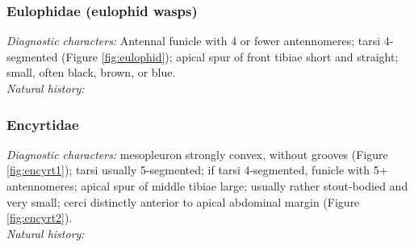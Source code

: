 \documentclass[letterpaper, 11pt]{article}
\begin{document}
\subsubsection{Eulophidae (eulophid wasps)}
\noindent{}\textit{Diagnostic characters:} Antennal funicle with 4 or fewer antennomeres; tarsi 4-segmented (Figure \ref{fig:eulophid}); apical spur of front tibiae short and straight; small, often black, brown, or blue.\\

\noindent{}\textit{Natural history:} 

\subsubsection{Encyrtidae}
\noindent{}\textit{Diagnostic characters:} mesopleuron strongly convex, without grooves (Figure \ref{fig:encyrt1}); tarsi usually 5-segmented; if tarsi 4-segmented, funicle with 5+ antennomeres; apical spur of middle tibiae large; usually rather stout-bodied and very small; cerci distinctly anterior to apical abdominal margin (Figure \ref{fig:encyrt2}).\\

\noindent{}\textit{Natural history:} 
\end{document}
